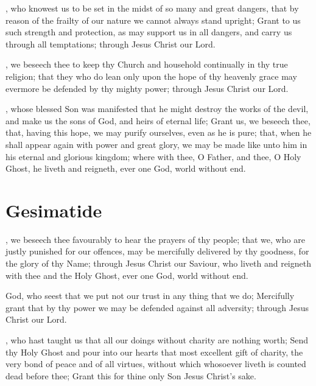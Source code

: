 , who knowest us to be set in the midst of so many and great dangers, that by reason of the frailty of our nature we cannot always stand upright; Grant to us such strength and protection, as may support us in all dangers, and carry us through all temptations; through Jesus Christ our Lord.

, we beseech thee to keep thy Church and household continually in thy true religion; that they who do lean only upon the hope of thy heavenly grace may evermore be defended by thy mighty power; through Jesus Christ our Lord.

, whose blessed Son was manifested that he might destroy the works of the devil, and make us the sons of God, and heirs of eternal life; Grant us, we beseech thee, that, having this hope, we may purify ourselves, even as he is pure; that, when he shall appear again with power and great glory, we may be made like unto him in his eternal and glorious kingdom; where with thee, O Father, and thee, O Holy Ghost, he liveth and reigneth, ever one God, world without end.

\section{Gesimatide}

, we beseech thee favourably to hear the prayers of thy people; that we, who are justly punished for our offences, may be mercifully delivered by thy goodness, for the glory of thy Name; through Jesus Christ our Saviour, who liveth and reigneth with thee and the Holy Ghost, ever one God, world without end.

 God, who seest that we put not our trust in any thing that we do; Mercifully grant that by thy power we may be defended against all adversity; through Jesus Christ our Lord.

, who hast taught us that all our doings without charity are nothing worth; Send thy Holy Ghost and pour into our hearts that most excellent gift of charity, the very bond of peace and of all virtues, without which whosoever liveth is counted dead before thee; Grant this for thine only Son Jesus Christ's sake.

